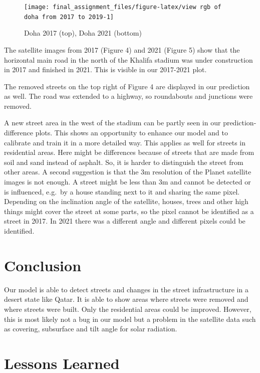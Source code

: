 \documentclass[
]{article}
\begin{document}
\begin{figure}

{\centering \texttt{[image: final\_assignment\_files/figure-latex/view rgb of doha from 2017 to 2019-1]} 

}

\caption{Doha 2017 (top), Doha 2021 (bottom)}\label{fig:view rgb of doha from 2017 to 2019}
\end{figure}

The satellite images from 2017 (Figure 4) and 2021 (Figure 5) show that
the horizontal main road in the north of the Khalifa stadium was under
construction in 2017 and finished in 2021. This is visible in our
2017-2021 plot.

The removed streets on the top right of Figure 4 are displayed in our
prediction as well. The road was extended to a highway, so roundabouts
and junctions were removed.

A new street area in the west of the stadium can be partly seen in our
prediction-difference plots. This shows an opportunity to enhance our
model and to calibrate and train it in a more detailed way. This applies
as well for streets in residential areas. Here might be differences
because of streets that are made from soil and sand instead of asphalt.
So, it is harder to distinguish the street from other areas. A second
suggestion is that the 3m resolution of the Planet satellite images is
not enough. A street might be less than 3m and cannot be detected or is
influenced, e.g.~by a house standing next to it and sharing the same
pixel. Depending on the inclination angle of the satellite, houses,
trees and other high things might cover the street at some parts, so the
pixel cannot be identified as a street in 2017. In 2021 there was a
different angle and different pixels could be identified.

\hypertarget{conclusion}{%
\section{Conclusion}\label{conclusion}}

Our model is able to detect streets and changes in the street
infrastructure in a desert state like Qatar. It is able to show areas
where streets were removed and where streets were built. Only the
residential areas could be improved. However, this is most likely not a
bug in our model but a problem in the satellite data such as covering,
subsurface and tilt angle for solar radiation.

\hypertarget{lessons-learned}{%
\section{Lessons Learned}\label{lessons-learned}}
\end{document}
